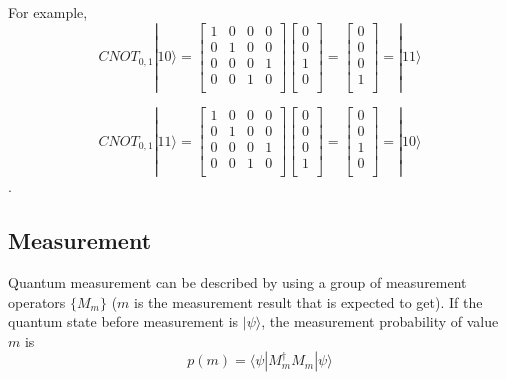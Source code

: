 For example,
\begin{equation}
CNOT_{0,1}|10\rangle = 
\begin{bmatrix}
1 & 0 & 0 & 0 \\
0 & 1 & 0 & 0 \\
0 & 0 & 0 & 1 \\
0 & 0 & 1 & 0 \\
\end{bmatrix}
 \left[
\begin{array}{c}
0 \\
0 \\
1 \\
0 \\
\end{array}
\right]
=  \left[
\begin{array}{c}
0 \\
0 \\
0 \\
1 \\
\end{array}
\right] 
= |11\rangle 
\end{equation}

\begin{equation}
CNOT_{0,1}|11\rangle = 
\begin{bmatrix}
1 & 0 & 0 & 0 \\
0 & 1 & 0 & 0 \\
0 & 0 & 0 & 1 \\
0 & 0 & 1 & 0 \\
\end{bmatrix}
 \left[
\begin{array}{c}
0 \\
0 \\
0 \\
1 \\
\end{array}
\right]
=  \left[
\begin{array}{c}
0 \\
0 \\
1 \\
0 \\
\end{array}
\right] 
= |10\rangle 
\end{equation}.

\subsection{Measurement}
Quantum measurement can be described by using a group of measurement operators $\{M_m\}$
($m$ is the measurement result that is expected to get).
 If the quantum state before measurement is $|\psi\rangle$, the measurement probability of value $m$ is 
 $$p(m) = \langle \psi|M^{\dagger}_m M_m|\psi\rangle$$

